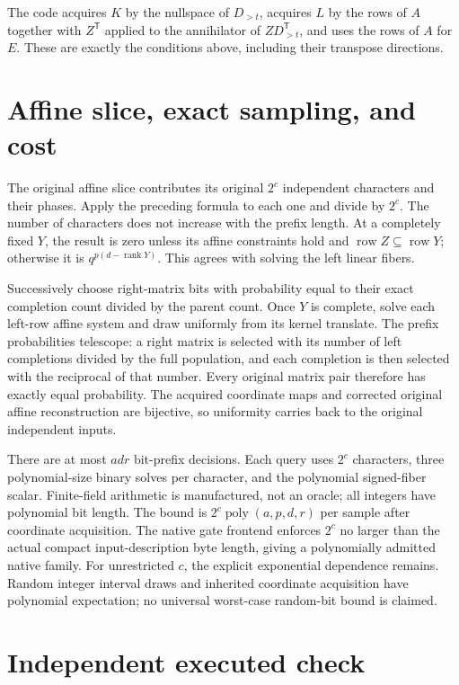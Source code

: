 \documentclass[11pt]{article}
\newcommand{\rank}{\operatorname{rank}}
\newcommand{\row}{\operatorname{row}}
\begin{document}
The code acquires $K$ by the nullspace of $D_{>t}$, acquires $L$ by the
rows of $A$ together with $Z^{\mathsf T}$ applied to the annihilator of
$ZD_{>t}^{\mathsf T}$, and uses the rows of $A$ for $E$. These are exactly
the conditions above, including their transpose directions.

\section{Affine slice, exact sampling, and cost}

The original affine slice contributes its original $2^c$ independent
characters and their phases. Apply the preceding formula to each one and
divide by $2^c$. The number of characters does not increase with the prefix
length. At a completely fixed $Y$, the result is zero unless its affine
constraints hold and $\row Z\subseteq\row Y$; otherwise it is
$q^{p(d-\rank Y)}$. This agrees with solving the left linear fibers.

Successively choose right-matrix bits with probability equal to their exact
completion count divided by the parent count. Once $Y$ is complete, solve
each left-row affine system and draw uniformly from its kernel translate.
The prefix probabilities telescope: a right matrix is selected with its
number of left completions divided by the full population, and each
completion is then selected with the reciprocal of that number. Every
original matrix pair therefore has exactly equal probability. The acquired
coordinate maps and corrected original affine reconstruction are bijective,
so uniformity carries back to the original independent inputs.

There are at most $adr$ bit-prefix decisions. Each query uses $2^c$
characters, three polynomial-size binary solves per character, and the
polynomial signed-fiber scalar. Finite-field arithmetic is manufactured,
not an oracle; all integers have polynomial bit length. The bound is
$2^c\operatorname{poly}(a,p,d,r)$ per sample after coordinate acquisition.
The native gate frontend enforces $2^c$ no larger than the actual compact
input-description byte length, giving a polynomially admitted native family.
For unrestricted $c$, the explicit exponential dependence remains.
Random integer interval draws and inherited coordinate acquisition have
polynomial expectation; no universal worst-case random-bit bound is claimed.

\section{Independent executed check}
\end{document}

